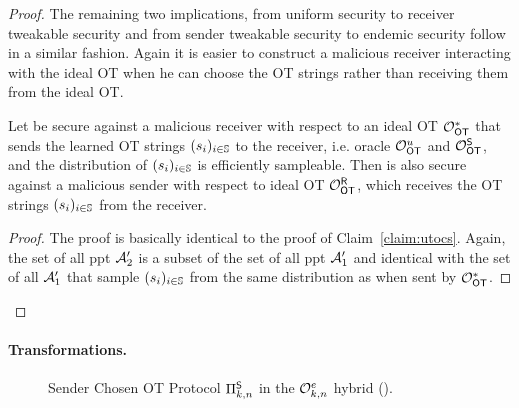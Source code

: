 \begin{proof}
The remaining two implications, from uniform security to receiver tweakable security and from sender tweakable security to endemic security follow in a similar fashion. Again it is easier to construct a malicious receiver interacting with the ideal OT when he can choose the OT strings rather than receiving them from the ideal OT.
\begin{claim}\label{claim:utocr}
Let \OT be secure against a malicious receiver with respect to an ideal OT $\mathcal{O}_{\mathsf{OT}}^*$ that sends the learned OT strings $(s_i)_{i\in\mathsf{\mathbb S}}$ to the receiver, i.e. oracle $\mathcal{O}_{\mathsf{OT}}^u$ and $\mathcal{O}_{\mathsf{OT}}^{\mathsf{S}}$, and the distribution of $(s_i)_{i\in\mathsf{\mathbb S}}$ is efficiently sampleable. Then \OT is also secure against a malicious sender with respect to ideal OT $\mathcal{O}_{\mathsf{OT}}^{\mathsf{R}}$, which receives the OT strings $(s_i)_{i\in\mathsf{\mathbb S}}$ from the receiver.
\end{claim}

\begin{proof}
The proof is basically identical to the proof of Claim~\ref{claim:utocs}. Again, the set of all ppt $\mathcal{A}_2'$ is a subset of the set of all ppt $\mathcal{A}_1'$ and identical with the set of all $\mathcal{A}_1'$ that sample  $(s_i)_{i\in\mathsf{\mathbb S}}$ from the same distribution as when sent by $\mathcal{O}_{\mathsf{OT}}^*$.
\end{proof}

\end{proof}








\paragraph{Transformations.} 


\begin{figure}[t]
	\caption{Sender Chosen OT Protocol $\Pi^{\mathsf{S}}_{k,n}$ in the $\mathcal{O}^{e}_{k,n}$ hybrid ().}
	\label{fig:protoSendOT}
\end{figure}


